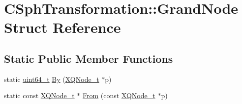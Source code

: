 \hypertarget{structCSphTransformation_1_1GrandNode}{\section{C\-Sph\-Transformation\-:\-:Grand\-Node Struct Reference}
\label{structCSphTransformation_1_1GrandNode}
}
\subsection*{Static Public Member Functions}
\begin{DoxyCompactItemize}
\item 
static \hyperlink{sphinxstd_8h_aaa5d1cd013383c889537491c3cfd9aad}{uint64\-\_\-t} \hyperlink{structCSphTransformation_1_1GrandNode_ad5eaac11fe00ab6e74e332ade6be0fe5}{By} (\hyperlink{structXQNode__t}{X\-Q\-Node\-\_\-t} $\ast$p)
\item 
static const \hyperlink{structXQNode__t}{X\-Q\-Node\-\_\-t} $\ast$ \hyperlink{structCSphTransformation_1_1GrandNode_a74d7ddc8b9be28a1a1514ea7fe90dce1}{From} (const \hyperlink{structXQNode__t}{X\-Q\-Node\-\_\-t} $\ast$p)
\end{DoxyCompactItemize}



